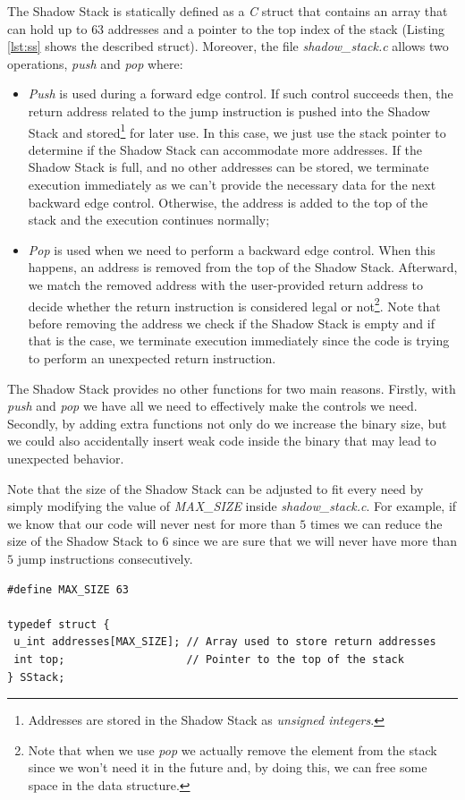 The Shadow Stack is statically defined as a \textit{C} struct that contains an array
that can hold up to $63$ addresses and a pointer to the top index of the stack (Listing
\ref{lst:ss} shows the described struct). Moreover, the file \textit{shadow\_stack.c}
allows two operations, \textit{push} and \textit{pop} where:
\begin{itemize}
  \item \textit{Push} is used during a forward edge control. If such control succeeds
    then, the return address related to the jump instruction is pushed into the
    Shadow Stack and stored\footnote{Addresses are stored in the Shadow Stack as
    \textit{unsigned integers}.} for later use. In this case, we just use the stack
    pointer to determine if the Shadow Stack can accommodate more addresses. If
    the Shadow Stack is full, and no other addresses can be stored, we terminate
    execution immediately as we can't provide the necessary data for the next
    backward edge control. Otherwise, the address is added to the top of the
    stack and the execution continues normally;

  \item \textit{Pop} is used when we need to perform a backward edge control. When
    this happens, an address is removed from the top of the Shadow Stack. Afterward,
    we match the removed address with the user-provided return address to decide
    whether the return instruction is considered legal or not\footnote{Note that
    when we use \textit{pop} we actually remove the element from the stack since
    we won't need it in the future and, by doing this, we can free some space in
    the data structure.}. Note that before removing the address we check if the
    Shadow Stack is empty and if that is the case, we terminate execution immediately
    since the code is trying to perform an unexpected return instruction.
\end{itemize}

The Shadow Stack provides no other functions for two main reasons. Firstly, with
\textit{push} and \textit{pop} we have all we need to effectively make the controls
we need. Secondly, by adding extra functions not only do we increase the binary size,
but we could also accidentally insert weak code inside the binary that may lead
to unexpected behavior.

Note that the size of the Shadow Stack can be adjusted to fit every need by
simply modifying the value of \textit{MAX\_SIZE} inside \textit{shadow\_stack.c}.
For example, if we know that our code will never nest for more than $5$ times we
can reduce the size of the Shadow Stack to $6$ since we are sure that we will
never have more than $5$ jump instructions consecutively. \\ \begin{lstlisting}[style=CStyle, caption = Shadow Stack definition inside \textit{shadow\_stack.c}, label={lst:ss}]
#define MAX_SIZE 63

typedef struct {
 u_int addresses[MAX_SIZE]; // Array used to store return addresses
 int top;                   // Pointer to the top of the stack
} SStack;
\end{lstlisting}

